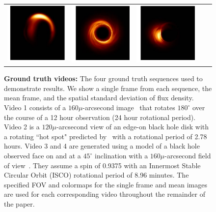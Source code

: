 \begin{figure}[h!]
\begin{center}
\begin{tabular}{   c | c  c  c  c  }
			\hspace{0.01in}
			 \includegraphics[height=.147\linewidth]{figures/starwarps_results/hotspot100sR2/gt/stdevimg_noaxis_r2.pdf}  \hspace{.59in} &
			
			\hspace{-0.01in} \includegraphics[height=.147\linewidth]{figures/starwarps_results/hotakamovie_02/gt/stdevimg_noaxis_r2.pdf}  \hspace{.55in} & 
			\hspace{-0.01in}
			\includegraphics[height=.147\linewidth]{figures/starwarps_results/hotakamovie_45/gt/stdevimg_noaxis_r2.pdf} \hspace{.55in} 
			\\
		\end{tabular}
		\vspace{.1in}
		\caption{{\bf Ground truth videos:} The four ground truth sequences used to demonstrate results. We show a single frame from each sequence, the mean frame, and the spatial standard deviation of flux density. Video 1 consists of a $160 \mu$-arcsecond image~\cite{avery} that rotates $180^{\circ}$ over the course of a 12 hour observation (24 hour rotational period). Video 2 is a $120 \mu$-arcsecond view of an edge-on black hole disk with a rotating ``hot spot" predicted by~\cite{Broderick_Loeb_2006} with a rotational period of 2.78 hours. Video 3 and 4 are generated using a model of a black hole observed face on and at a $45^{\circ}$ inclination with a $160 \mu$-arcsecond field of view~\cite{Shiokawa_2013}. They assume a spin of 0.9375 with an Innermost Stable Circular Orbit (ISCO) rotational period of 8.96 minutes. The specified FOV and colormaps for the single frame and mean images are used for each corresponding video throughout the remainder of the paper. }
		\label{fig:groundtruth}
	\end{center}
		\vspace{-.2in}
\end{figure}


